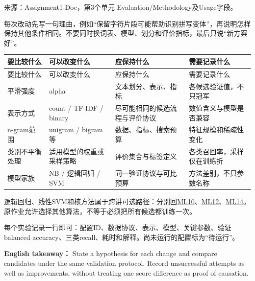 来源：Assignment1-Doc，第3个单元 Evaluation/Methodology及Usage字段。








每次改动先写一句理由，例如“保留字符片段可能帮助识别拼写变体”，再说明怎样保持其他条件相同。不要同时换词表、模型、划分和评价指标，最后只说“新方案好”。


\begingroup
\small\setlength{\tabcolsep}{3pt}
\renewcommand{\arraystretch}{1.22}
\begin{longtable}{@{}>{\raggedright\arraybackslash}p{}>{\raggedright\arraybackslash}p{}>{\raggedright\arraybackslash}p{}>{\raggedright\arraybackslash}p{}@{}}
\toprule
要比较什么 & 可以改变什么 & 应保持什么 & 需要记录什么 \\
\midrule\endfirsthead
要比较什么 & 可以改变什么 & 应保持什么 & 需要记录什么 \\
\midrule\endhead
\bottomrule\endfoot
平滑强度 & alpha & 文本划分、表示、指标 & 各候选验证值，不只冠军 \\
表示方式 & count / TF-IDF / binary & 尽可能相同的候选流程与评价协议 & 数值含义与模型是否兼容 \\
n-gram范围 & unigram / bigram等 & 数据、指标、搜索预算 & 特征规模和稀疏性变化 \\
类别不平衡处理 & 适用模型的权重或采样策略 & 评价集合与标签定义 & 各类召回率，采样仅在训练折 \\
模型家族 & NB / 逻辑回归 / SVM & 同一验证协议与可比预算 & 方法差别，不只参数名称 \\
\end{longtable}
\endgroup


逻辑回归、线性SVM和核方法属于跨讲可选路径：分别回\href{https://crazyshout.github.io/micro-course/?lesson=ml10}{ML10}、\href{https://crazyshout.github.io/micro-course/?lesson=ml12}{ML12}、\href{https://crazyshout.github.io/micro-course/?lesson=ml14}{ML14}。原作业允许选择其他算法，不等于必须把所有候选都训练一次。


每个实验记录一行即可：配置ID、数据协议、表示、模型、关键参数、验证balanced accuracy、三类recall、耗时和解释。尚未运行的配置标为“待运行”。


\textbf{English takeaway：} State a hypothesis for each change and compare candidates under the same validation protocol. Record unsuccessful attempts as well as improvements, without treating one score difference as proof of causation.






